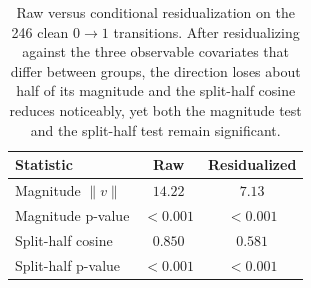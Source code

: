 \begin{table}[h]
\centering
\begin{tabular}{lcc}
\toprule
Statistic & Raw & Residualized \\
\midrule
Magnitude $\|v\|$             & $14.22$  & $7.13$ \\
Magnitude p-value             & $< 0.001$ & $< 0.001$ \\
Split-half cosine             & $0.850$  & $0.581$ \\
Split-half p-value            & $< 0.001$ & $< 0.001$ \\
\bottomrule
\end{tabular}
\caption{Raw versus conditional residualization on the 246 clean $0 \to 1$ transitions. After residualizing against the three observable covariates that differ between groups, the direction loses about half of its magnitude and the split-half cosine reduces noticeably, yet both the magnitude test and the split-half test remain significant.}
\label{tab:residualization}
\end{table}

